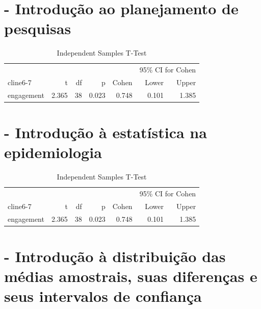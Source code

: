 \documentclass[
]{book}
\begin{document}
\hypertarget{planejamento_pesquisas}{%
\chapter{- Introdução ao planejamento de pesquisas}\label{planejamento_pesquisas}}

\begin{table}[h]
\centering
\caption{Independent Samples T-Test}
\label{tab:independentSamplesT-Test}
{
\begin{tabular}{lrrrrrr}
\toprule
\multicolumn{1}{c}{} & \multicolumn{1}{c}{} & \multicolumn{1}{c}{} & \multicolumn{1}{c}{} & \multicolumn{1}{c}{} & \multicolumn{2}{c}{95\% CI for Cohen} \\
cline{6-7}
& t & df & p & Cohen & Lower & Upper  \\
\cmidrule[0.4pt]{1-7}
engagement & 2.365 & 38 & 0.023 & 0.748 & 0.101 & 1.385  \\
\bottomrule
\end{tabular}
}
\end{table}

\hypertarget{estatistica_epidemiologia}{%
\chapter{- Introdução à estatística na epidemiologia}\label{estatistica_epidemiologia}}

\begin{table}[h]
\centering
\caption{Independent Samples T-Test}
\label{tab:independentSamplesT-Test}
{
\begin{tabular}{lrrrrrr}
\toprule
\multicolumn{1}{c}{} & \multicolumn{1}{c}{} & \multicolumn{1}{c}{} & \multicolumn{1}{c}{} & \multicolumn{1}{c}{} & \multicolumn{2}{c}{95\% CI for Cohen} \\
cline{6-7}
& t & df & p & Cohen & Lower & Upper  \\
\cmidrule[0.4pt]{1-7}
engagement & 2.365 & 38 & 0.023 & 0.748 & 0.101 & 1.385  \\
\bottomrule
\end{tabular}
}
\end{table}

\hypertarget{dist_medias_amostrais}{%
\chapter{- Introdução à distribuição das médias amostrais, suas diferenças e seus intervalos de confiança}\label{dist_medias_amostrais}}
\end{document}
